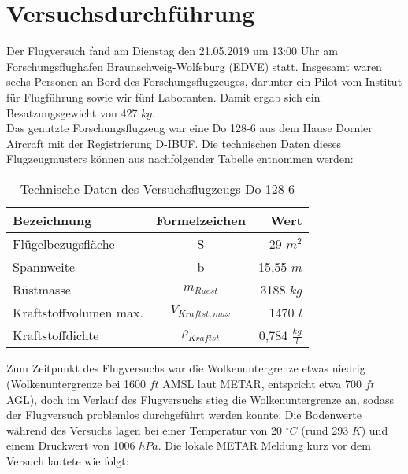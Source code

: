 \chapter{Versuchsdurchführung}
\label{chapter:versuch}
Der Flugversuch fand am  Dienstag den 21.05.2019 um 13:00 Uhr am Forschungsflughafen Braunschweig-Wolfsburg (EDVE) statt. Insgesamt waren sechs Personen an Bord des Forschungsflugzeuges, darunter ein Pilot vom Institut für Flugführung sowie wir fünf Laboranten. Damit ergab sich ein Besatzungsgewicht von 427 $kg$.\\
Das genutzte Forschungsflugzeug war eine Do 128-6 aus dem Hause Dornier Aircraft mit der Registrierung D-IBUF. Die technischen Daten dieses Flugzeugmusters können aus nachfolgender Tabelle entnommen werden:\\

\begin{table}[h]
	\centering
	\begin{tabular}{|l|c|r|}
		\hline
		\textbf{Bezeichnung}         	& \textbf{Formelzeichen} & \textbf{Wert}           		\\ \hline
		Flügelbezugsfläche           	& S                      & 29 $m^2$ 					\\ \hline
		Spannweite                   	& b                      & 15,55 $m$                 	\\ \hline
		Rüstmasse                    	& $m_{Ruest}$             & 3188 $kg$                 	\\ \hline
		Kraftstoffvolumen max. 			& $V_{Kraftst,max}$      & 1470 $l$            			\\ \hline
		Kraftstoffdichte             	& $\rho_{Kraftst}$       & 0,784 $\frac{kg}{l}$      	\\ \hline
	\end{tabular}
	\caption{Technische Daten des Versuchsflugzeugs Do 128-6} \label{tab:do128}
\end{table}
\vspace{0.3cm}

\noindent Zum Zeitpunkt des Flugversuchs war die Wolkenuntergrenze etwas niedrig (Wolkenuntergrenze bei 1600 $ft$ AMSL laut METAR, entspricht etwa 700 $ft$ AGL), doch im Verlauf des Flugversuchs stieg die Wolkenuntergrenze an, sodass der Flugversuch problemlos durchgeführt werden konnte. Die Bodenwerte während des Versuchs lagen bei einer Temperatur von 20 $^\circ C$ (rund 293 $K$) und einem Druckwert von 1006 $hPa$. Die lokale METAR Meldung kurz vor dem Versuch lautete wie folgt:\\\\

